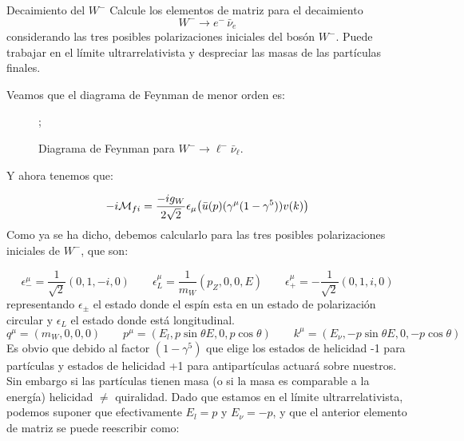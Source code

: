 
\begin{Ejercicio}{Decaimiento del $W^-$}\label{Ej:17}
Calcule los elementos de matriz para el decaimiento 
\[
W^- \to e^- \, \bar{\nu}_e
\]
considerando las tres posibles polarizaciones iniciales del bosón $W^-$.  
Puede trabajar en el límite ultrarrelativista y despreciar las masas de las partículas finales.
\end{Ejercicio}

Veamos que el diagrama de Feynman de menor orden es: 
\begin{figure}[H]
	\centering
	;
	\caption{Diagrama de Feynman para \(W^- \to \ell^- \bar{\nu}_\ell\).}
\end{figure}
Y ahora tenemos que: 

\begin{equation}
	-i\Mcal_{fi} = \frac{-ig_W}{2\sqrt{2}} \epsilon_\mu  \pqty{ \bar{u}(p) (\gamma^\mu  (1-\gamma^5))v(k)}
\end{equation}
Como ya se ha dicho, debemos calcularlo para las tres posibles polarizaciones iniciales de $W^-$, que son: 

\begin{equation}
	\epsilon_- ^\mu = \frac{1}{\sqrt{2}} (0,1,-i,0) \qquad \epsilon_L^\mu = \frac{1}{m_W} (p_Z,0,0,E) \qquad \epsilon_+^\mu = - \frac{1}{\sqrt{2}} (0,1,i,0)
\end{equation}
representando $\epsilon_\pm$ el estado donde el espín esta en un estado de polarización circular y $\epsilon_L$ el estado donde está longitudinal.
\begin{equation}
	q^\mu = (m_W,0,0,0) \qquad p^\mu = (E_l, p\sin  \theta E,0,p \cos \theta)  \qquad k^\mu = (E_\nu, -p\sin  \theta E,0,-p \cos \theta)
\end{equation}
Es obvio que debido al factor $(1-\gamma^5)$ que elige los estados de helicidad -1 para partículas y estados de helicidad +1 para antipartículas actuará sobre nuestros. Sin embargo si las partículas tienen masa (o si la masa es comparable a la energía) helicidad $\neq$ quiralidad. Dado que estamos en el límite ultrarrelativista, podemos suponer que efectivamente $E_l= p$ y $E_\nu = -p$, y que el anterior elemento de matriz se puede reescribir como: 

